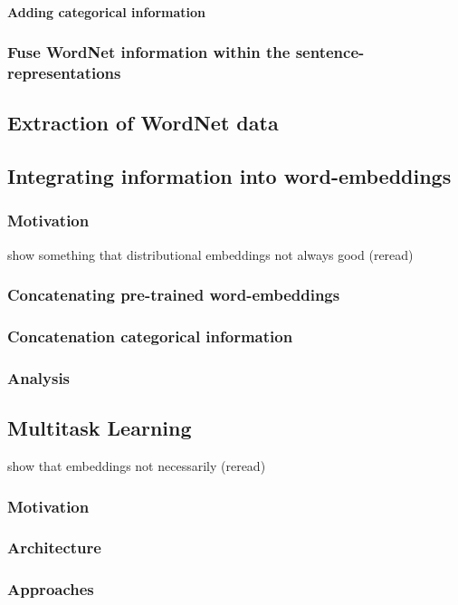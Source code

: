 \paragraph*{Adding categorical information}
\subsubsection{Fuse WordNet information within the sentence-representations}

\subsection{Extraction of WordNet data}
\subsection{Integrating information into word-embeddings}
\subsubsection{Motivation}
\citep{rubinstein2015well} show something that distributional embeddings not always good (reread)
\subsubsection{Concatenating pre-trained word-embeddings}
\subsubsection{Concatenation categorical information}
\subsubsection{Analysis}
\subsection{Multitask Learning}
\citep{levy2015improving} show that embeddings not necessarily (reread)
\subsubsection{Motivation}
\subsubsection{Architecture}
\subsubsection{Approaches}
